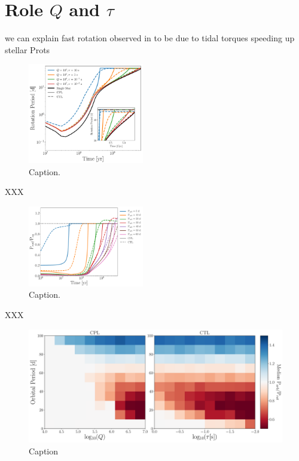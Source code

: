 \documentclass[twocolumn]{aastex61}
\begin{document}

\section{Role $Q$ and $\tau$}

we can explain fast rotation observed in \citet{Meibom2007} to be due to tidal torques speeding up stellar Prots

\begin{figure}
	\includegraphics[width=0.45\textwidth]{../Plots/example.pdf}
   \caption{Caption.}%
    \label{fig:coupledExample}%
\end{figure}

XXX

\begin{figure}
	\includegraphics[width=0.45\textwidth]{../Plots/eqPer.pdf}
   \caption{Caption.}%
    \label{fig:eqPer}%
\end{figure}

XXX

\begin{figure}[ht]
	\includegraphics[width=\textwidth]{../Plots/qTauPorbRatioHist.pdf}
   \caption{Caption}%
    \label{fig:qTauLock}%
\end{figure}
\end{document}
